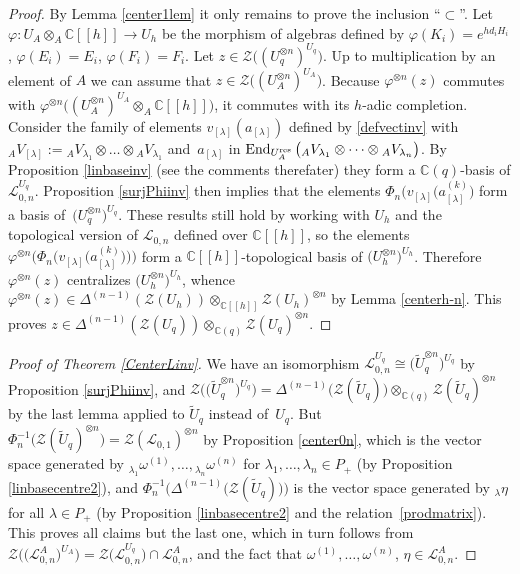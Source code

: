 \documentclass[pdftex]{sigma}%
\numberwithin{equation}{section}
\numberwithin{figure}{section}
\newcommand{\mc}{\mathbb{C}}
\newcommand{\Ll}{{\mathcal L}}
\begin{document}
\begin{proof}
By Lemma \ref{center1lem} it only remains to prove the inclusion ``$\subset$''. Let $\varphi\colon U_A\otimes_A {\mathbb C}[[h]] \rightarrow U_h$ be the morphism of algebras defined by $\varphi(K_i)=e^{h d_i H_i}$, $\varphi(E_i)=E_i$, $\varphi(F_i)=F_i$. Let $z\in\mathcal{Z}\big((U_{q}^{\otimes n})^{U_q}\big)$. Up to multiplication by an element of $A$ we can assume that $z\in \mathcal{Z}\big((U_{A}^{\otimes n})^{U_A}\big)$. Because $\varphi^{\otimes n}(z)$ commutes with $\varphi^{\otimes n}\big((U_A^{\otimes n})^{U_A}\otimes_A {\mathbb C}[[h]]\big)$, it commutes with its $h$-adic completion. Consider the family of elements $v_{[\lambda]}(a_{[\lambda]})$ defined by \eqref{defvectinv} with ${}_{A}V_{[\lambda]} := {}_AV_{\lambda_1}\otimes \dots \otimes {}_AV_{\lambda_1}$ and~$a_{[\lambda]}$ in $\operatorname{End}_{U_A^{\rm res}}\big({}_AV_{\lambda_1}\otimes \dots \otimes {}_AV_{\lambda_n}\big)$. By Proposition \ref{linbaseinv} (see the comments therefater) they form a $\mc(q)$-basis of $\Ll_{0,n}^{U_q}$. Proposition \ref{surjPhiinv} then implies that the elements $\Phi_n(v_{[\lambda]}\big(a_{[\lambda]}^{(k)}\big)$ form a basis of~$\big(U_q^{\otimes n}\big)^{U_q}$. These results still hold by working with $U_h$ and the topological version of $\Ll_{0,n}$ defined over $\mc[[h]]$, so the elements $\varphi^{\otimes n}\big(\Phi_n\big(v_{[\lambda]}\big(a_{[\lambda]}^{(k)}\big)\big)\big)$ form a ${\mathbb C}[[h]]$-topological basis of $\big(U_{h}^{\otimes n}\big)^{U_h}$. Therefore $\varphi^{\otimes n}(z)$ centralizes $\big(U_{h}^{\otimes n}\big)^{U_{h}}$, whence $\varphi^{\otimes n}(z)\in \Delta^{(n-1)}(\mathcal{Z}(U_h))\otimes_{{\mathbb C}[[h]]}\mathcal{Z}(U_h)^{\otimes n}$ by Lemma \ref{centerh-n}. This proves $z\in \Delta^{(n-1)}(\mathcal{Z}(U_q))\otimes_{{\mathbb C}(q)}\mathcal{Z}(U_q)^{\otimes n}$. \end{proof}

\begin{proof}[Proof of Theorem \ref{CenterLinv}]
We have an isomorphism ${\mathcal L}_{0,n}^{U_q}\cong \big(\tilde{U}_q^{\otimes n}\big)^{U_q}$ by Proposition \ref{surjPhiinv}, and $\mathcal{Z}\big(\big(\tilde{U}_q^{\otimes n}\big)^{U_q}\big)=\Delta^{(n-1)}\big(\mathcal{Z}(\tilde{U}_q)\big)\otimes_{{\mathbb C}(q)}\mathcal{Z}(\tilde{U}_q)^{\otimes n}$ by the last lemma applied to $\tilde U_q$ instead of~$U_q$. But $\Phi_n^{-1}\big(\mathcal{Z}(\tilde{U}_q)^{\otimes n}\big) = \mathcal{Z}({\mathcal L}_{0,1})^{\otimes n}$ by Proposition \ref{center0n}, which is the vector space generated by ${}_{\lambda_1}\omega^{(1)},\dots, {}_{\lambda_n}\omega^{(n)}$ for $\lambda_1,\dots,\lambda_n\in P_+$ (by Proposition \ref{linbasecentre2}), and $\Phi_n^{-1} \big(\Delta^{(n-1)}\big(\mathcal{Z}(\tilde{U}_q)\big)\big)$ is the vector space generated by ${}_\lambda\eta$ for all $\lambda\in P_+$ (by Proposition \ref{linbasecentre2} and the relation~\eqref{prodmatrix}). This proves all claims but the last one, which in turn follows from $\mathcal{Z}\big(\big(\Ll_{0,n}^A\big)^{U_A}\big) = \mathcal{Z}\big(\Ll_{0,n}^{U_q}\big) \cap \Ll_{0,n}^A$, and the fact that $\omega^{(1)},\dots,\omega^{(n)}$, $\eta\in \Ll_{0,n}^A$.
\end{proof}
\end{document}
